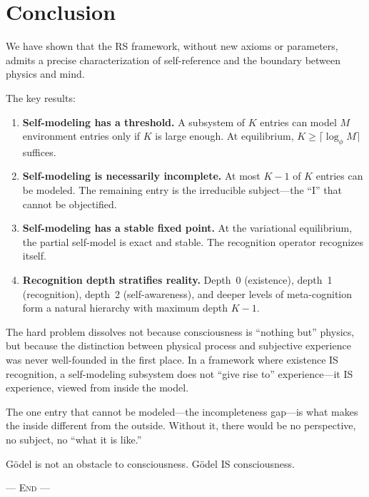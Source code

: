 \documentclass[11pt,a4paper]{article}
\theoremstyle{plain}
\theoremstyle{definition}
\theoremstyle{remark}
\begin{document}
\section{Conclusion}
\label{sec:conclusion}

We have shown that the RS framework, without new axioms or parameters,
admits a precise characterization of self-reference and the boundary
between physics and mind.

The key results:

\begin{enumerate}[nosep]
\item \textbf{Self-modeling has a threshold.}  A subsystem of $K$
  entries can model $M$ environment entries only if $K$ is large enough.
  At equilibrium, $K \geq \lceil\log_\phi M\rceil$ suffices.

\item \textbf{Self-modeling is necessarily incomplete.}  At most
  $K - 1$ of $K$ entries can be modeled.  The remaining entry is the
  irreducible subject---the ``I'' that cannot be objectified.

\item \textbf{Self-modeling has a stable fixed point.}  At the
  variational equilibrium, the partial self-model is exact and stable.
  The recognition operator recognizes itself.

\item \textbf{Recognition depth stratifies reality.}  Depth~0
  (existence), depth~1 (recognition), depth~2 (self-awareness), and
  deeper levels of meta-cognition form a natural hierarchy with
  maximum depth $K - 1$.
\end{enumerate}

The hard problem dissolves not because consciousness is ``nothing but''
physics, but because the distinction between physical process and
subjective experience was never well-founded in the first place.  In a
framework where existence IS recognition, a self-modeling subsystem does
not ``give rise to'' experience---it IS experience, viewed from inside
the model.

The one entry that cannot be modeled---the incompleteness gap---is what
makes the inside different from the outside.  Without it, there would
be no perspective, no subject, no ``what it is like.''

G\"odel is not an obstacle to consciousness.  G\"odel IS consciousness.

\bigskip
\begin{center}
\textsc{--- End ---}
\end{center}
\end{document}
